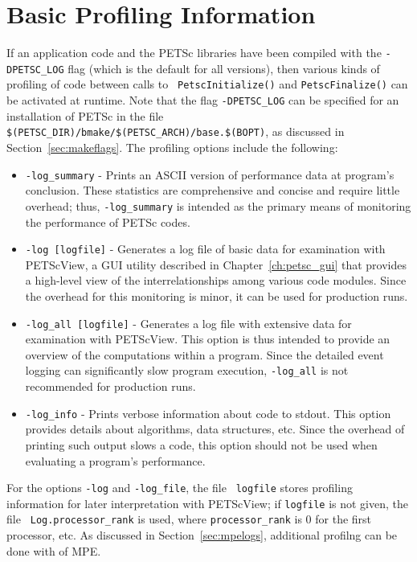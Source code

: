 \section{Basic Profiling Information}
\label{sec:profbasic}
   

If an application code and the PETSc libraries have been compiled with
the {\tt -DPETSC\_LOG} flag (which is the default for all versions),
then various kinds of profiling of code between calls to {\tt
PetscInitialize()} and {\tt PetscFinalize()} can be 
activated at runtime.  Note that the flag {\tt -DPETSC\_LOG} can be
specified for an installation of PETSc in the file {\tt
\$(PETSC\_DIR)/bmake/\$(PETSC\_ARCH)/base.\$(BOPT)}, as discussed in
Section~\ref{sec:makeflags}.  The profiling options include the following:
   
\begin{itemize}
\item {\tt -log\_summary} - Prints an ASCII version of performance data
     at program's conclusion. These statistics are comprehensive and concise
     and require little overhead; thus, {\tt -log\_summary} is intended as
     the primary means of monitoring the performance of PETSc codes.
\item {\tt -log [logfile]} - Generates a log file of basic data for examination
     with PETScView, a GUI utility described in Chapter~\ref{ch:petsc_gui}
     that provides a high-level view of the interrelationships
     among various code modules.  Since the overhead for this monitoring is minor,
     it can be used for production runs.  
\item {\tt -log\_all [logfile]} - Generates a log file with extensive data
     for examination with PETScView.  This option is thus intended to
     provide an overview of the computations within a program.  Since the
     detailed event logging can significantly slow program execution, 
     {\tt -log\_all} is not recommended for production runs.
\item {\tt -log\_info} - Prints verbose information about code to stdout. 
     This option provides details about algorithms, data structures, etc.
     Since the overhead of printing such output slows a code, this
     option should not be used when evaluating a program's performance.
\end{itemize}
For the options {\tt -log} and {\tt -log\_file}, the file {\tt
logfile} stores profiling information for later interpretation with
PETScView; if {\tt logfile} is not given, the file {\tt
Log.processor\_rank} is used, where {\tt processor\_rank} is 0 for the
first processor, etc.  As discussed in Section~\ref{sec:mpelogs},
additional profilng can be done with of MPE.

